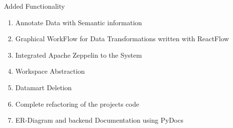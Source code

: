 \documentclass[12pt]{beamer}
\begin{document}
\begin{textblock}{0.5}
		\begin{block}{Added Functionality}
			\begin{enumerate}
				\item Annotate Data with Semantic information
				\item Graphical WorkFlow for Data Transformations written with ReactFlow
				\item Integrated Apache Zeppelin to the System
				\item Workspace Abstraction
				\item Datamart Deletion
				\item Complete refactoring of the projects code
				\item ER-Diagram and backend Documentation using PyDocs
			\end{enumerate}
			
			\vspace{0.5\baselineskip}
			
		\end{block}
		
		
	\end{textblock}
	
	
\end{document}

